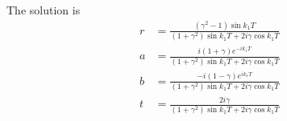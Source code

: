 \documentclass[letterpaper]{article}
\begin{document}
The solution is 
\begin{align*}
  r &= \frac{ (\gamma^2 - 1)\sin k_1 T}
            { (1+\gamma^2)\sin k_1 T + 2i\gamma\cos k_1 T}
\\
  a &= \frac{ i(1+\gamma)e^{-ik_1 T}}
            { (1+\gamma^2)\sin k_1 T + 2i\gamma\cos k_1 T}
\\
  b &= \frac{ -i(1-\gamma)e^{ik_1 T}}
            { (1+\gamma^2)\sin k_1 T + 2i\gamma\cos k_1 T}
\\
  t &= \frac{ 2i\gamma }
            { (1+\gamma^2)\sin k_1 T + 2i\gamma\cos k_1 T}
\end{align*}
\end{document}
